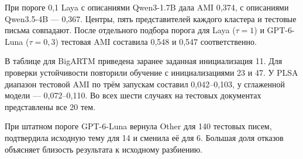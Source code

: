 При пороге 0,1 Laya с описаниями Qwen3-1.7B дала AMI 0,374, с описаниями Qwen3.5-4B --- 0,367. Центры, пять представителей каждого кластера и тестовые письма совпадают. После отдельного подбора порога для Laya ($\tau=1$) и GPT-6-Luna ($\tau=0,3$) тестовая AMI составила 0,548 и 0,547 соответственно.

В таблице для BigARTM приведена заранее заданная инициализация 11. Для проверки устойчивости повторили обучение с инициализациями 23 и 47. У PLSA диапазон тестовой AMI по трём запускам составил 0,042--0,103, у сглаженной модели --- 0,072--0,110. Во всех шести случаях на тестовых документах представлены все 20 тем.

При штатном пороге GPT-6-Luna вернула Other для 140 тестовых писем, подтвердила исходную тему для 14 и сменила её для 6. Большая доля отказов объясняет близость результата к исходному разбиению.
